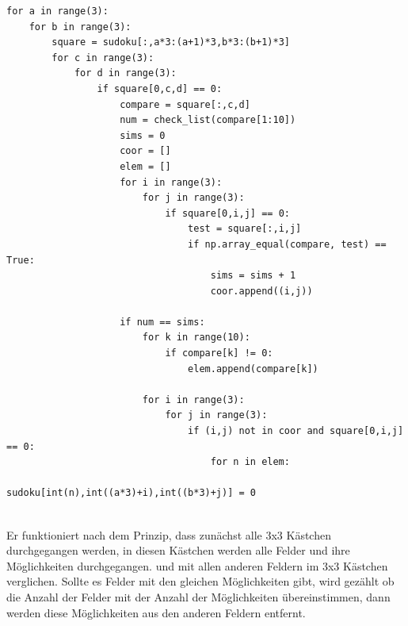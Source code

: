 \documentclass[11pt,a4paper]{article}
\begin{document}
\begin{verbatim}
for a in range(3):   
    for b in range(3): 
        square = sudoku[:,a*3:(a+1)*3,b*3:(b+1)*3]  
        for c in range(3):      
            for d in range(3):  
                if square[0,c,d] == 0:              
                    compare = square[:,c,d]         
                    num = check_list(compare[1:10]) 
                    sims = 0                        
                    coor = []                      
                    elem = []                       
                    for i in range(3):              
                        for j in range(3):          
                            if square[0,i,j] == 0:  
                                test = square[:,i,j]
                                if np.array_equal(compare, test) == True: 
                                    sims = sims + 1                       
                                    coor.append((i,j))                    
                                             
                    if num == sims:                    
                        for k in range(10):             
                            if compare[k] != 0:
                                elem.append(compare[k])
                                    
                        for i in range(3):     
                            for j in range(3):
                                if (i,j) not in coor and square[0,i,j] == 0:
                                    for n in elem:                           
                                        sudoku[int(n),int((a*3)+i),int((b*3)+j)] = 0   
\end{verbatim}
\ \\
Er funktioniert nach dem Prinzip, dass zunächst alle 3x3 Kästchen durchgegangen werden, in diesen Kästchen werden alle Felder und ihre Möglichkeiten durchgegangen. und mit allen anderen Feldern im 3x3 Kästchen verglichen. Sollte es Felder mit den gleichen Möglichkeiten gibt, wird gezählt ob die Anzahl der Felder mit der Anzahl der Möglichkeiten übereinstimmen, dann werden diese Möglichkeiten aus den anderen Feldern entfernt.
\ \\
\end{document}
